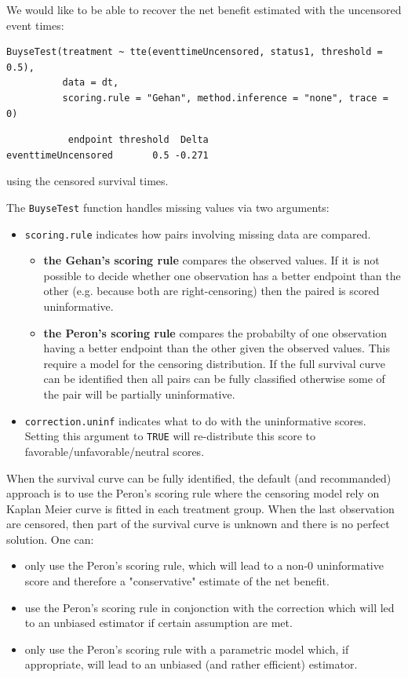\documentclass[12pt]{article}
\begin{document}
We would like to be able to recover the net benefit estimated with the uncensored event times:
\lstset{language=r,label= ,caption= ,captionpos=b,numbers=none}
\begin{lstlisting}
BuyseTest(treatment ~ tte(eventtimeUncensored, status1, threshold = 0.5),
          data = dt,
          scoring.rule = "Gehan", method.inference = "none", trace = 0)
\end{lstlisting}

\begin{verbatim}
           endpoint threshold  Delta
eventtimeUncensored       0.5 -0.271
\end{verbatim}


using the censored survival times.

\clearpage

The \texttt{BuyseTest} function handles missing values via two arguments:
\begin{itemize}
\item \texttt{scoring.rule} indicates how pairs involving missing data are compared. 
\begin{itemize}
\item \textbf{the Gehan's scoring rule} compares the observed values. If it is
not possible to decide whether one observation has a better
endpoint than the other (e.g. because both are right-censoring)
then the paired is scored uninformative.
\item \textbf{the Peron's scoring rule} compares the probabilty of one
observation having a better endpoint than the other given the
observed values. This require a model for the censoring
distribution. If the full survival curve can be identified then
all pairs can be fully classified otherwise some of the pair
will be partially uninformative.
\end{itemize}
\item \texttt{correction.uninf} indicates what to do with the uninformative
scores. Setting this argument to \texttt{TRUE} will re-distribute this
score to favorable/unfavorable/neutral scores.
\end{itemize}

When the survival curve can be fully identified, the default (and
recommanded) approach is to use the Peron's scoring rule where the
censoring model rely on Kaplan Meier curve is fitted in each treatment
group. When the last observation are censored, then part of the
survival curve is unknown and there is no perfect solution. One can:
\begin{itemize}
\item only use the Peron's scoring rule, which will lead to a non-0
uninformative score and therefore a "conservative" estimate of the net benefit.
\item use the Peron's scoring rule in conjonction with the correction
which will led to an unbiased estimator if certain assumption are met.
\item only use the Peron's scoring rule with a parametric model which, if
appropriate, will lead to an unbiased (and rather efficient)
estimator.
\end{itemize}
\end{document}
